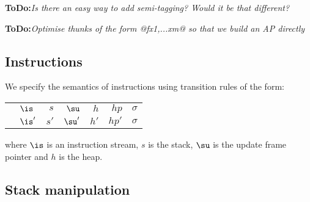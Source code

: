 \documentclass[11pt]{article}
\newcommand{\ToDo}[1]{{{\bf ToDo:}\sl #1}}
\newcommand{\Subsection}[2]{\subsection{#1}\label{sec:#2}}
\begin{document}
\ToDo{Is there an easy way to add semi-tagging?  Would it be that different?}

\ToDo{Optimise thunks of the form @f{x1,...xm}@ so that we build an AP directly}

\Subsection{Instructions}{hugs-instructions}

We specify the semantics of instructions using transition rules of
the form:

\begin{tabular}{|llrrrrr|}
\hline
	& $\is$		& $s$ 	& $\su$ 	& $h$  & $hp$  & $\sigma$ \\
\next	& $\is'$	& $s'$ 	& $\su'$	& $h'$ & $hp'$ & $\sigma$ \\
\hline
\end{tabular}

where $\is$ is an instruction stream, $s$ is the stack, $\su$ is the 
update frame pointer and $h$ is the heap.


\Subsection{Stack manipulation}{hugs-stack-manipulation}
\end{document}
